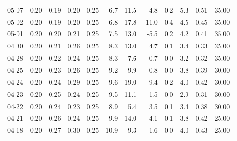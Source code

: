 \begin{threeparttable}
{\begin{tabular}{lrrrrrrrrrrr}
  05-07 &          0.20 &          0.19 &          0.20 &        0.25 &                 6.7 &                11.5 &       -4.8 &                 0.2 &              5.3 &            0.51 &                  35.00 \\
  05-02 &          0.20 &          0.19 &          0.20 &        0.25 &                 6.8 &                17.8 &      -11.0 &                 0.4 &              4.5 &            0.45 &                  35.00 \\
  05-01 &          0.20 &          0.20 &          0.21 &        0.25 &                 7.5 &                13.0 &       -5.5 &                 0.2 &              4.2 &            0.41 &                  35.00 \\
  04-30 &          0.20 &          0.21 &          0.26 &        0.25 &                 8.3 &                13.0 &       -4.7 &                 0.1 &              3.4 &            0.33 &                  35.00 \\
  04-28 &          0.20 &          0.22 &          0.24 &        0.25 &                 8.3 &                 7.6 &        0.7 &                 0.0 &              3.2 &            0.32 &                  35.00 \\
  04-25 &          0.20 &          0.23 &          0.26 &        0.25 &                 9.2 &                 9.9 &       -0.8 &                 0.0 &              3.8 &            0.39 &                  30.00 \\
  04-24 &          0.20 &          0.24 &          0.29 &        0.25 &                 9.6 &                19.0 &       -9.4 &                 0.2 &              4.0 &            0.42 &                  30.00 \\
  04-23 &          0.20 &          0.25 &          0.24 &        0.25 &                 9.5 &                11.1 &       -1.5 &                 0.0 &              2.9 &            0.31 &                  30.00 \\
  04-22 &          0.20 &          0.24 &          0.23 &        0.25 &                 8.9 &                 5.4 &        3.5 &                 0.1 &              3.4 &            0.38 &                  30.00 \\
  04-21 &          0.20 &          0.26 &          0.24 &        0.25 &                 9.9 &                14.0 &       -4.1 &                 0.1 &              3.8 &            0.42 &                  25.00 \\
  04-18 &          0.20 &          0.27 &          0.30 &        0.25 &                10.9 &                 9.3 &        1.6 &                 0.0 &              4.0 &            0.43 &                  25.00 \\

\end{tabular}}
\end{threeparttable}
